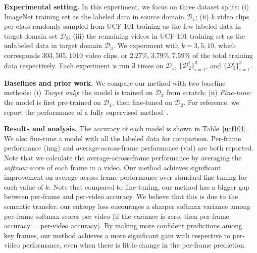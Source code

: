 \textbf{Experimental setting.} In this experiment, we focus on three dataset splits: (i) ImageNet training set as the labeled data in source domain $\mathcal{D}_{1}$; (ii) $k$ video clips per class randomly sampled from UCF-101 training as the few labeled data in target domain set $\mathcal{D}_{2}$; (iii) the remaining videos in UCF-101 training set as the unlabeled data in target domain $\mathcal{D}_{3}$. We experiment with $k=3,5,10$, which corresponds $303,505,1010$ video clips, or $2.27\%,3.79\%,7.59\%$ of the total training data respectively. Each experiment is run $3$ times on $\mathcal{D}_{1}$, $\{\mathcal{D}_{2}^{i}\}_{i=1}^{3}$, and $\{\mathcal{D}_{3}^{i}\}_{i=1}^{3}$.

\textbf{Baselines and prior work.} We compare our method with two baseline methods: (i) \textit{Target only}: the model is trained on $\mathcal{D}_{2}$ from scratch; (ii) \textit{Fine-tune}: the model is first pre-trained on $\mathcal{D}_{1}$, then fine-tuned on $\mathcal{D}_{2}$. For reference, we report the performance of a fully supervised method~\cite{simonyan2014two}.

\textbf{Results and analysis.} The accuracy of each model is shown in Table~\ref{ucf101}. We also fine-tune a model with all the labeled data for comparison. Per-frame performance (img) and average-across-frame performance (vid) are both reported. Note that we calculate the average-across-frame performance by averaging the \textit{softmax} score of each frame in a video. Our method achieves significant improvement on average-across-frame performance over standard fine-tuning for each value of $k$. Note that compared to fine-tuning, our method has a bigger gap between per-frame and per-video accuracy. We believe that this is due to the semantic transfer: our entropy loss encourages a sharper softmax variance among per-frame softmax scores per video (if the variance is zero, then per-frame accuracy = per-video accuracy). By making more confident predictions among key frames, our method achieves a more significant gain with respective to per-video performance, even when there is little change in the per-frame prediction.

